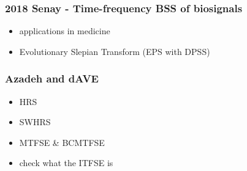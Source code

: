 \documentclass{article}
\begin{document}
\subsubsection{2018 Senay - Time-frequency BSS of biosignals}
\begin{itemize}
    \item applications in medicine
    \item Evolutionary Slepian Transform (EPS with DPSS)
\end{itemize}

\subsubsection{Azadeh and dAVE}
\begin{itemize}
    \item HRS
    \item SWHRS
    \item MTFSE \& BCMTFSE
    \item check what the ITFSE is
\end{itemize}
\end{document}
